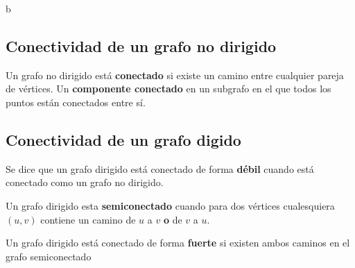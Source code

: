 b\documentclass[11pt]{article}
\theoremstyle{plain}
\begin{document}
        \subsection{Conectividad de un grafo no dirigido} %
        \label{sub:conectividad_de_un_grafo_no_dirigido}
            Un grafo no dirigido está \textbf{conectado} si existe un camino entre cualquier pareja de vértices. Un \textbf{componente conectado} en un subgrafo en el que todos los puntos están conectados entre sí.

        \subsection{Conectividad de un grafo digido} %
        \label{sub:conectividad_de_un_grafo_digido}
            Se dice que un grafo dirigido está conectado de forma \textbf{débil} cuando está conectado como un grafo no dirigido.

            Un grafo dirigido esta \textbf{semiconectado} cuando para dos vértices cualesquiera $(u,v)$ contiene un camino de $u$ a $v$ \textbf{o} de $v$ a $u$.

            Un grafo dirigido está conectado de forma \textbf{fuerte} si existen ambos caminos en el grafo semiconectado
\end{document}

